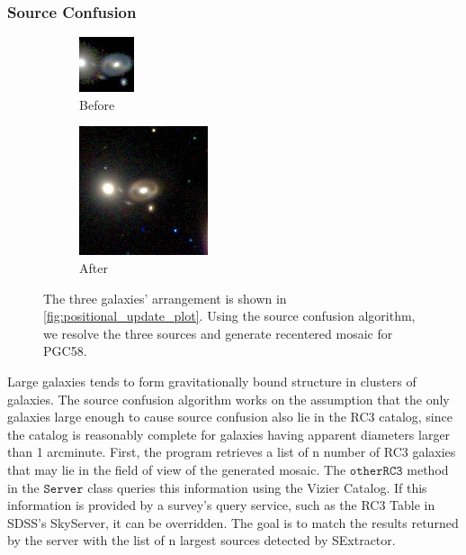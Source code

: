 \documentclass[authoryear, 12pt,5p, times]{elsarticle}
\begin{document}
	\subsubsection{Source Confusion}
\begin{figure}
\begin{subfigure}{.2\textwidth}
\centering
  \includegraphics[width=.5\linewidth ]{figures/PGC58b4SC}
  \caption{Before}
\end{subfigure}%
\begin{subfigure}{.2\textwidth}
\centering
  \includegraphics[width=.5\linewidth]{figures/PGC58afterSC}
  \caption{After} 
\end{subfigure}
\caption{ The three galaxies' arrangement is shown in \autoref{fig:positional_update_plot}. Using the source confusion algorithm, we resolve the three sources and generate recentered mosaic for PGC58.}
\label{fig:SCdemo}
\end{figure}
\indent Large galaxies tends to form gravitationally bound structure in clusters of galaxies. The source confusion algorithm works on the assumption that the only galaxies large enough to cause source confusion also lie in the RC3 catalog, since the catalog is reasonably complete for galaxies having apparent diameters larger than 1 arcminute. First, the program retrieves a list of n number of RC3 galaxies that may lie in the field of view of the generated mosaic. The $\texttt{otherRC3}$ method in the $\texttt{Server}$ class queries this information using the Vizier Catalog. If this information is provided by a survey's query service, such as the RC3 Table in SDSS's SkyServer, it can be overridden. The goal is to match the results returned by the server with the list of n largest sources detected by SExtractor. 
\end{document}
